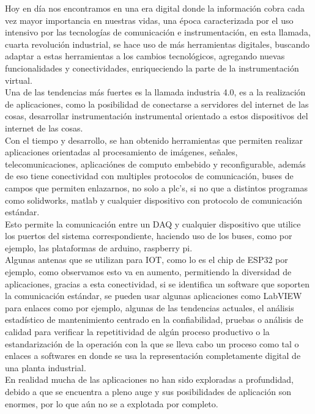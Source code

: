 \documentclass[12pt,letterpaper, onecolumn, titlepage, oneside]{book}
\begin{document}
Hoy en día nos encontramos en una era digital donde la información cobra cada vez mayor importancia en nuestras vidas, una época caracterizada por el uso intensivo por las tecnologías de comunicación e instrumentación, en esta llamada, cuarta revolución industrial, se hace uso de más herramientas digitales, buscando adaptar a estas herramientas a los cambios tecnológicos, agregando nuevas funcionalidades y conectividades, enriqueciendo la parte de la instrumentación virtual.\\

Una de las tendencias más fuertes es la llamada industria 4.0, es a la realización de aplicaciones, como la posibilidad de conectarse a servidores del internet de las cosas, desarrollar instrumentación instrumental orientado a estos dispositivos del internet de las cosas.\\

Con el tiempo y desarrollo, se han obtenido herramientas que permiten realizar aplicaciones orientadas al procesamiento de imágenes, señales, telecomunicaciones, aplicaciónes de computo embebido y reconfigurable, además de eso tiene conectividad con multiples protocolos de comunicación, buses de campos que permiten enlazarnos, no solo a plc's, si no que a distintos programas como solidworks, matlab y cualquier dispositivo con protocolo de comunicación estándar.\\

Esto permite la comunicación entre un DAQ y cualquier dispositivo que utilice los puertos del sistema correspondiente, haciendo uso de los buses, como por ejemplo, las plataformas de arduino, raspberry pi.\\

Algunas antenas que se utilizan para IOT, como lo es el chip de ESP32 por ejemplo, como observamos esto va en aumento, permitiendo la diversidad de aplicaciones, gracias a esta conectividad, si se identifica un software que soporten la comunicación estándar, se pueden usar algunas aplicaciones como LabVIEW para enlaces como por ejemplo, algunas de las tendencias actuales, el análisis estadístico de mantenimiento centrado en la confiabilidad, pruebas o análisis de calidad para verificar la repetitividad de algún proceso productivo o la estandarización de la operación con la que se lleva cabo un proceso como tal o enlaces a softwares en donde se usa la representación completamente digital de una planta industrial.\\

En realidad mucha de las aplicaciones no han sido exploradas a profundidad, debido a que se encuentra a pleno auge y sus posibilidades de aplicación son enormes, por lo que aún no se a explotada por completo.\\
\end{document}
